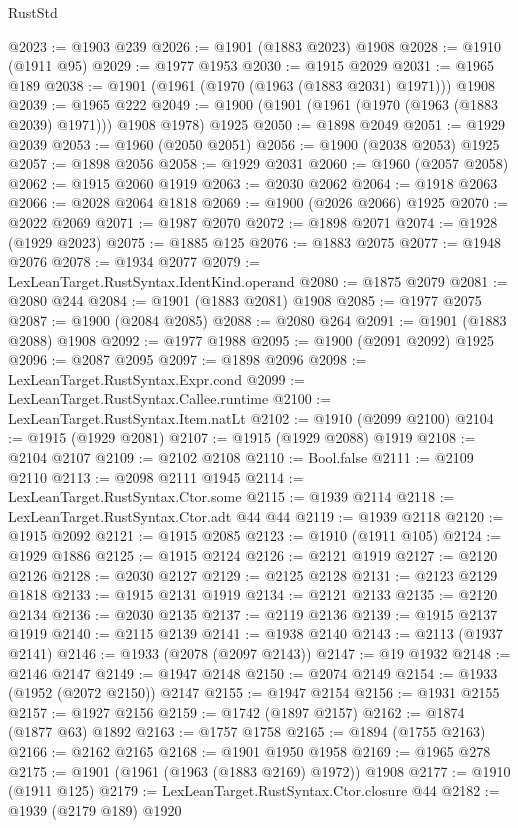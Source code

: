 \begin{lexlean}{RustStd}
\begin{coremodule}
{\begin{coremodule}
{{{{{{{{{{{{{{{{{{{{{{{{{{{{{{{{{{{{{{{{{{{@2023 := @1903 @239
@2026 := @1901 (@1883 @2023) @1908
@2028 := @1910 (@1911 @95)
@2029 := @1977 @1953
@2030 := @1915 @2029
@2031 := @1965 @189
@2038 := @1901 (@1961 (@1970 (@1963 (@1883 @2031) @1971))) @1908
@2039 := @1965 @222
@2049 := @1900 (@1901 (@1961 (@1970 (@1963 (@1883 @2039) @1971))) @1908 @1978) @1925
@2050 := @1898 @2049
@2051 := @1929 @2039
@2053 := @1960 (@2050 @2051)
@2056 := @1900 (@2038 @2053) @1925
@2057 := @1898 @2056
@2058 := @1929 @2031
@2060 := @1960 (@2057 @2058)
@2062 := @1915 @2060 @1919
@2063 := @2030 @2062
@2064 := @1918 @2063
@2066 := @2028 @2064 @1818
@2069 := @1900 (@2026 @2066) @1925
@2070 := @2022 @2069
@2071 := @1987 @2070
@2072 := @1898 @2071
@2074 := @1928 (@1929 @2023)
@2075 := @1885 @125
@2076 := @1883 @2075
@2077 := @1948 @2076
@2078 := @1934 @2077
@2079 := LexLeanTarget.RustSyntax.IdentKind.operand
@2080 := @1875 @2079
@2081 := @2080 @244
@2084 := @1901 (@1883 @2081) @1908
@2085 := @1977 @2075
@2087 := @1900 (@2084 @2085)
@2088 := @2080 @264
@2091 := @1901 (@1883 @2088) @1908
@2092 := @1977 @1988
@2095 := @1900 (@2091 @2092) @1925
@2096 := @2087 @2095
@2097 := @1898 @2096
@2098 := LexLeanTarget.RustSyntax.Expr.cond
@2099 := LexLeanTarget.RustSyntax.Callee.runtime
@2100 := LexLeanTarget.RustSyntax.Item.natLt
@2102 := @1910 (@2099 @2100)
@2104 := @1915 (@1929 @2081)
@2107 := @1915 (@1929 @2088) @1919
@2108 := @2104 @2107
@2109 := @2102 @2108
@2110 := Bool.false
@2111 := @2109 @2110
@2113 := @2098 @2111 @1945
@2114 := LexLeanTarget.RustSyntax.Ctor.some
@2115 := @1939 @2114
@2118 := LexLeanTarget.RustSyntax.Ctor.adt @44 @44
@2119 := @1939 @2118
@2120 := @1915 @2092
@2121 := @1915 @2085
@2123 := @1910 (@1911 @105)
@2124 := @1929 @1886
@2125 := @1915 @2124
@2126 := @2121 @1919
@2127 := @2120 @2126
@2128 := @2030 @2127
@2129 := @2125 @2128
@2131 := @2123 @2129 @1818
@2133 := @1915 @2131 @1919
@2134 := @2121 @2133
@2135 := @2120 @2134
@2136 := @2030 @2135
@2137 := @2119 @2136
@2139 := @1915 @2137 @1919
@2140 := @2115 @2139
@2141 := @1938 @2140
@2143 := @2113 (@1937 @2141)
@2146 := @1933 (@2078 (@2097 @2143))
@2147 := @19 @1932
@2148 := @2146 @2147
@2149 := @1947 @2148
@2150 := @2074 @2149
@2154 := @1933 (@1952 (@2072 @2150)) @2147
@2155 := @1947 @2154
@2156 := @1931 @2155
@2157 := @1927 @2156
@2159 := @1742 (@1897 @2157)
@2162 := @1874 (@1877 @63) @1892
@2163 := @1757 @1758
@2165 := @1894 (@1755 @2163)
@2166 := @2162 @2165
@2168 := @1901 @1950 @1958
@2169 := @1965 @278
@2175 := @1901 (@1961 (@1963 (@1883 @2169) @1972)) @1908
@2177 := @1910 (@1911 @125)
@2179 := LexLeanTarget.RustSyntax.Ctor.closure @44
@2182 := @1939 (@2179 @189) @1920
}}}}}}}}}}}}}}}}}}}}}}}}}}}}}}}}}}}}}}}}}}}
\end{coremodule}}
\end{coremodule}
\end{lexlean}
